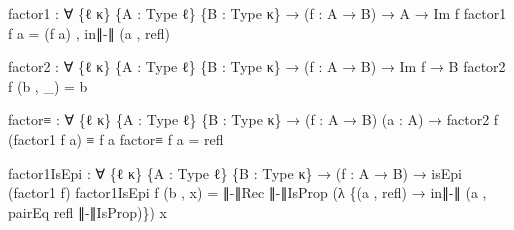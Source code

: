 \documentclass[
  11pt,
  oneside,
  article]{memoir}
\newenvironment{Shaded}{}{}
\newcommand{\NormalTok}[1]{#1}
\newcommand{\OtherTok}[1]{\textcolor[rgb]{0.00,0.44,0.13}{#1}}
\theoremstyle{definition}
\theoremstyle{plain}
\newcommand{\0}{\textsf{0}}
\newcommand{\1}{\tn{\textsf{1}}}
\begin{document}
\begin{Shaded}
\begin{Highlighting}[]
\NormalTok{factor1 }\OtherTok{:} \OtherTok{∀} \OtherTok{\{}\NormalTok{ℓ κ}\OtherTok{\}} \OtherTok{\{}\NormalTok{A }\OtherTok{:}\NormalTok{ Type ℓ}\OtherTok{\}} \OtherTok{\{}\NormalTok{B }\OtherTok{:}\NormalTok{ Type κ}\OtherTok{\}} \OtherTok{→} \OtherTok{(}\NormalTok{f }\OtherTok{:}\NormalTok{ A }\OtherTok{→}\NormalTok{ B}\OtherTok{)} \OtherTok{→}\NormalTok{ A }\OtherTok{→}\NormalTok{ Im f}
\NormalTok{factor1 f a }\OtherTok{=} \OtherTok{(}\NormalTok{f a}\OtherTok{)}\NormalTok{ , in∥{-}∥ }\OtherTok{(}\NormalTok{a , refl}\OtherTok{)}

\NormalTok{factor2 }\OtherTok{:} \OtherTok{∀} \OtherTok{\{}\NormalTok{ℓ κ}\OtherTok{\}} \OtherTok{\{}\NormalTok{A }\OtherTok{:}\NormalTok{ Type ℓ}\OtherTok{\}} \OtherTok{\{}\NormalTok{B }\OtherTok{:}\NormalTok{ Type κ}\OtherTok{\}} \OtherTok{→} \OtherTok{(}\NormalTok{f }\OtherTok{:}\NormalTok{ A }\OtherTok{→}\NormalTok{ B}\OtherTok{)} \OtherTok{→}\NormalTok{ Im f }\OtherTok{→}\NormalTok{ B}
\NormalTok{factor2 f }\OtherTok{(}\NormalTok{b , }\OtherTok{\_)} \OtherTok{=}\NormalTok{ b}

\NormalTok{factor≡ }\OtherTok{:} \OtherTok{∀} \OtherTok{\{}\NormalTok{ℓ κ}\OtherTok{\}} \OtherTok{\{}\NormalTok{A }\OtherTok{:}\NormalTok{ Type ℓ}\OtherTok{\}} \OtherTok{\{}\NormalTok{B }\OtherTok{:}\NormalTok{ Type κ}\OtherTok{\}} 
          \OtherTok{→} \OtherTok{(}\NormalTok{f }\OtherTok{:}\NormalTok{ A }\OtherTok{→}\NormalTok{ B}\OtherTok{)} \OtherTok{(}\NormalTok{a }\OtherTok{:}\NormalTok{ A}\OtherTok{)} \OtherTok{→}\NormalTok{ factor2 f }\OtherTok{(}\NormalTok{factor1 f a}\OtherTok{)}\NormalTok{ ≡ f a}
\NormalTok{factor≡ f a }\OtherTok{=}\NormalTok{ refl}

\NormalTok{factor1IsEpi }\OtherTok{:} \OtherTok{∀} \OtherTok{\{}\NormalTok{ℓ κ}\OtherTok{\}} \OtherTok{\{}\NormalTok{A }\OtherTok{:}\NormalTok{ Type ℓ}\OtherTok{\}} \OtherTok{\{}\NormalTok{B }\OtherTok{:}\NormalTok{ Type κ}\OtherTok{\}}
               \OtherTok{→} \OtherTok{(}\NormalTok{f }\OtherTok{:}\NormalTok{ A }\OtherTok{→}\NormalTok{ B}\OtherTok{)} \OtherTok{→}\NormalTok{ isEpi }\OtherTok{(}\NormalTok{factor1 f}\OtherTok{)}
\NormalTok{factor1IsEpi f }\OtherTok{(}\NormalTok{b , x}\OtherTok{)} \OtherTok{=} 
\NormalTok{    ∥{-}∥Rec ∥{-}∥IsProp }
          \OtherTok{(λ} \OtherTok{\{(}\NormalTok{a , refl}\OtherTok{)} \OtherTok{→}\NormalTok{ in∥{-}∥ }\OtherTok{(}\NormalTok{a , pairEq refl ∥{-}∥IsProp}\OtherTok{)\})} 
\NormalTok{          x}


\end{Highlighting}
\end{Shaded}
\end{document}
